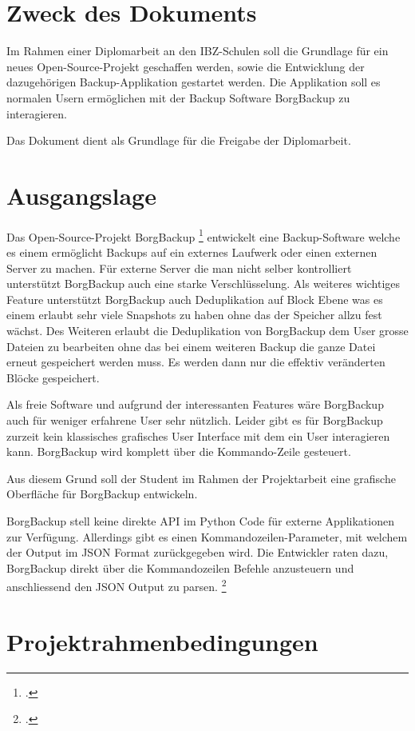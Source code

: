 
\section{Zweck des Dokuments}
\label{sec:orge135904}
Im Rahmen einer Diplomarbeit an den IBZ-Schulen soll die Grundlage für ein neues
Open-Source-Projekt geschaffen werden, sowie die Entwicklung der dazugehörigen
Backup-Applikation gestartet werden. Die Applikation soll es normalen Usern
ermöglichen mit der Backup Software BorgBackup zu interagieren.

Das Dokument dient als Grundlage für die Freigabe der Diplomarbeit.

\section{Ausgangslage}
\label{sec:org331938b}
Das Open-Source-Projekt BorgBackup \footcite{borgbackup} entwickelt eine
Backup-Software welche es einem ermöglicht Backups auf ein externes Laufwerk
oder einen externen Server zu machen. Für externe Server die man nicht selber
kontrolliert unterstützt BorgBackup auch eine starke Verschlüsselung. Als
weiteres wichtiges Feature unterstützt BorgBackup auch Deduplikation auf Block
Ebene was es einem erlaubt sehr viele Snapshots zu haben ohne das der Speicher
allzu fest wächst. Des Weiteren erlaubt die Deduplikation von BorgBackup dem
User grosse Dateien zu bearbeiten ohne das bei einem weiteren Backup die ganze
Datei erneut gespeichert werden muss. Es werden dann nur die effektiv
veränderten Blöcke gespeichert.

Als freie Software und aufgrund der interessanten Features wäre BorgBackup auch
für weniger erfahrene User sehr nützlich. Leider gibt es für BorgBackup zurzeit
kein klassisches grafisches User Interface mit dem ein User interagieren kann.
BorgBackup wird komplett über die Kommando-Zeile gesteuert.

Aus diesem Grund soll der Student im Rahmen der Projektarbeit eine grafische
Oberfläche für BorgBackup entwickeln.

BorgBackup stell keine direkte API im Python Code für externe Applikationen zur
Verfügung. Allerdings gibt es einen Kommandozeilen-Parameter, mit welchem der
Output im JSON Format zurückgegeben wird. Die Entwickler raten dazu, BorgBackup
direkt über die Kommandozeilen Befehle anzusteuern und anschliessend den JSON
Output zu parsen. \footcite{jsonapi}

\section{Projektrahmenbedingungen}
\label{sec:orge05a9c9}

